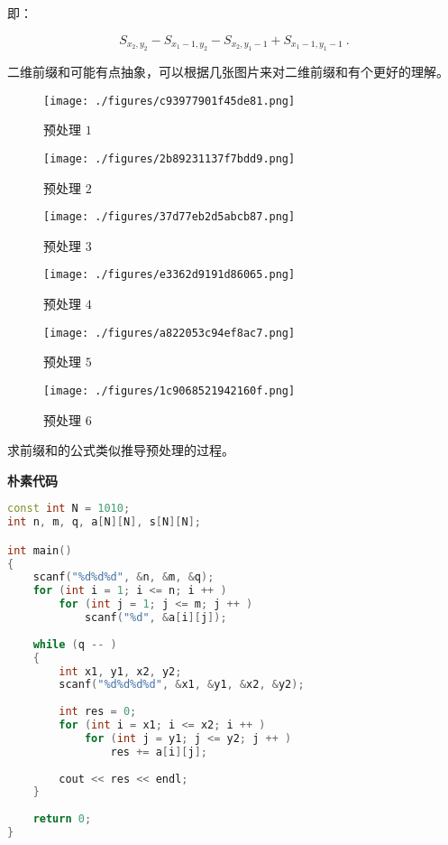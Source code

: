 即：

\begin{equation}
S_{x_2, y_2} - S_{x_1 - 1, y_2} - S_{x_2, y_1 - 1} + S_{x_1 - 1, y_1 - 1}~.
\end{equation}

二维前缀和可能有点抽象，可以根据几张图片来对二维前缀和有个更好的理解。

\begin{figure}[ht]
\centering
\texttt{[image: ./figures/c93977901f45de81.png]}
\caption{预处理 $1$} \label{fig_PS_2}
\end{figure}


\begin{figure}[ht]
\centering
\texttt{[image: ./figures/2b89231137f7bdd9.png]}
\caption{预处理 $2$ } \label{fig_PS_1}
\end{figure}

\begin{figure}[ht]
\centering
\texttt{[image: ./figures/37d77eb2d5abcb87.png]}
\caption{预处理 $3$} \label{fig_PS_3}
\end{figure}

\begin{figure}[ht]
\centering
\texttt{[image: ./figures/e3362d9191d86065.png]}
\caption{预处理 $4$} \label{fig_PS_4}
\end{figure}

\begin{figure}[ht]
\centering
\texttt{[image: ./figures/a822053c94ef8ac7.png]}
\caption{预处理 $5$} \label{fig_PS_5}
\end{figure}

\begin{figure}[ht]
\centering
\texttt{[image: ./figures/1c9068521942160f.png]}
\caption{预处理 $6$} \label{fig_PS_6}
\end{figure}

求前缀和的公式类似推导预处理的过程。

\textbf{朴素代码}

\begin{lstlisting}[language=cpp]
const int N = 1010;
int n, m, q, a[N][N], s[N][N];

int main()
{
    scanf("%d%d%d", &n, &m, &q);
    for (int i = 1; i <= n; i ++ )
        for (int j = 1; j <= m; j ++ )
            scanf("%d", &a[i][j]);
    
    while (q -- ) 
    {
        int x1, y1, x2, y2;
        scanf("%d%d%d%d", &x1, &y1, &x2, &y2);
        
        int res = 0;
        for (int i = x1; i <= x2; i ++ )
            for (int j = y1; j <= y2; j ++ )
                res += a[i][j];
        
        cout << res << endl;
    }
    
    return 0;
}
\end{lstlisting}

